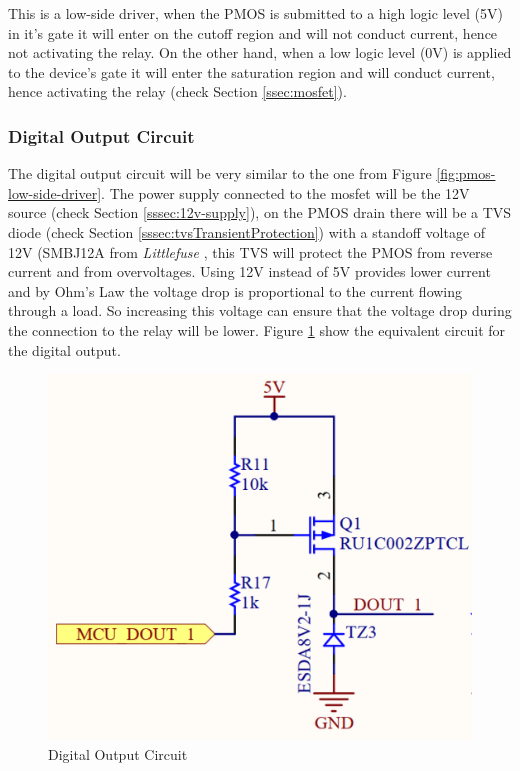 			This is a low-side driver, when the PMOS is submitted to a high logic level (5V) in it's gate it will enter on the cutoff region and will not conduct current, hence not activating the relay. On the other hand, when a low logic level (0V) is applied to the device's gate it will enter the saturation region and will conduct current, hence activating the relay (check Section \ref{ssec:mosfet}).

		\subsubsection{Digital Output Circuit}\label{sssec:digital-output-circuit}

			The digital output circuit will be very similar to the one from Figure \ref{fig:pmos-low-side-driver}. The power supply connected to the mosfet will be the 12V source (check Section \ref{sssec:12v-supply}), on the PMOS drain there will be a TVS diode (check Section \ref{sssec:tvsTransientProtection}) with a standoff voltage of 12V (SMBJ12A from \textit{Littlefuse} \cite{smbj12a-datasheet}, this TVS will protect the PMOS from reverse current and from overvoltages. Using 12V instead of 5V provides lower current and by Ohm's Law the voltage drop is proportional to the current flowing through a load. So increasing this voltage can ensure that the voltage drop during the connection to the relay will be lower. Figure \ref{fig:digital-output-circuit} show the equivalent circuit for the digital output.

			\begin{figure}[htbp]
				\centering
				\includegraphics[scale=0.7]{figuras/fig-digital-output-circuit.png}
				\caption{Digital Output Circuit \cite{digital-output-circuit}}
				\label{fig:digital-output-circuit}
			\end{figure}

